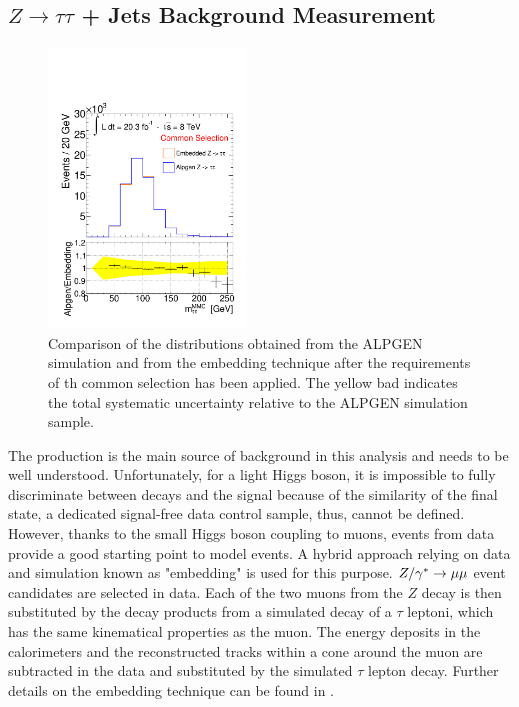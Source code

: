 \subsection{$Z \rightarrow \tau\tau$ + Jets Background Measurement}\label{sec:ztau}

\begin{figure}[tp]
     \begin{center}

            \includegraphics[page=1, width=0.47\textwidth]{figure/emb_plots.pdf}
\end{center}
    \caption{Comparison of the \mmc distributions obtained from the ALPGEN \Ztautau simulation and from the embedding technique after 
	the requirements of th common selection  has been applied. 
	The yellow bad indicates the total systematic uncertainty  relative to the ALPGEN simulation sample.}
   \label{fig:emb_vs_alp1}
\end{figure}

The  \Ztautau production is the main  source of  background in this analysis and needs to be well understood.
Unfortunately, for a light Higgs boson, it is impossible to fully discriminate between  \Ztautau decays 
and the signal because of the similarity of the final state, a dedicated signal-free data control sample, thus, cannot be defined.
However, thanks to the small Higgs boson coupling to muons, \Zmumu events from data  provide a good starting point to 
model \Ztautau events. A hybrid approach relying on data and simulation known as  "embedding" is used for this purpose.
$Z/\gamma^* \rightarrow \mu\mu$ event candidates are selected in data. Each of the two muons from the $Z$ decay is then substituted by the decay 
products from a simulated decay of a $\tau$ leptoni, which has the same kinematical properties as the muon. 
The energy deposits in the calorimeters and the reconstructed tracks within a cone  around the muon are subtracted in the data
and substituted by the simulated $\tau$ lepton decay.  Further details on the embedding technique can be found in \cite{Embedding, SMold}.

